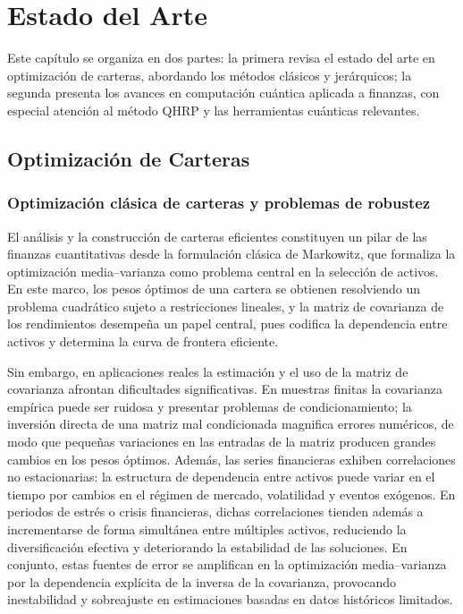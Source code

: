 \chapter{Estado del Arte}
\label{cap:estado_arte}

Este capítulo se organiza en dos partes: la primera revisa el estado del arte en optimización de carteras, abordando los métodos clásicos y jerárquicos; la segunda presenta los avances en computación cuántica aplicada a finanzas, con especial atención al método \gls{QHRP} y las herramientas cuánticas relevantes.

\section{Optimización de Carteras}
\label{sec:estado_arte_optimizacion}

\subsection{Optimización clásica de carteras y problemas de robustez}
\label{subsec:optimizacion_clasica_robustez}
El análisis y la construcción de carteras eficientes constituyen un pilar de las finanzas cuantitativas desde la formulación clásica de Markowitz\cite{markowitz1952}, que formaliza la optimización media–varianza como problema central en la selección de activos. En este marco, los pesos óptimos de una cartera se obtienen resolviendo un problema cuadrático sujeto a restricciones lineales, y la matriz de covarianza de los rendimientos desempeña un papel central, pues codifica la dependencia entre activos y determina la curva de frontera eficiente.

Sin embargo, en aplicaciones reales la estimación y el uso de la matriz de covarianza afrontan dificultades significativas. En muestras finitas la covarianza empírica puede ser ruidosa y presentar problemas de condicionamiento; la inversión directa de una matriz mal condicionada magnifica errores numéricos, de modo que pequeñas variaciones en las entradas de la matriz producen grandes cambios en los pesos óptimos. Además, las series financieras exhiben correlaciones no estacionarias: la estructura de dependencia entre activos puede variar en el tiempo por cambios en el régimen de mercado, volatilidad y eventos exógenos. En periodos de estrés o crisis financieras, dichas correlaciones tienden además a incrementarse de forma simultánea entre múltiples activos, reduciendo la diversificación efectiva y deteriorando la estabilidad de las soluciones. En conjunto, estas fuentes de error se amplifican en la optimización media–varianza por la dependencia explícita de la inversa de la covarianza, provocando inestabilidad y sobreajuste en estimaciones basadas en datos históricos limitados.

